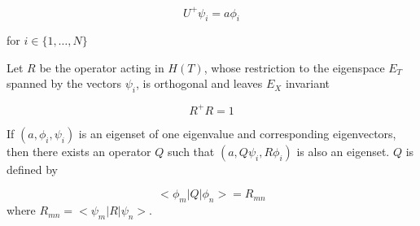 \begin{equation}
U^+\psi_i=a\phi_i
\end{equation}
 
for  $i\in\{1,\dots, N\}$
 
Let $R$ be the operator acting in $H(T)$, whose restriction to the
eigenspace $E_T$ spanned by the vectors $\psi_i$, is orthogonal
and leaves $E_X$ invariant
 
\begin{equation}
R^+R=1
\end{equation}

\begin{thm}
If $(a,\phi_i,\psi_i)$ is an eigenset of one
eigenvalue and corresponding eigenvectors, then there exists
an operator $Q$ such that $(a,Q\psi_i,R\phi_i)$ is also an eigenset.
$Q$ is defined by
 
\begin{equation}
<\phi_m|Q|\phi_n>=R_{m n}
\end{equation}
where $R_{mn}=<\psi_m|R|\psi_n>$.
\end{thm}


